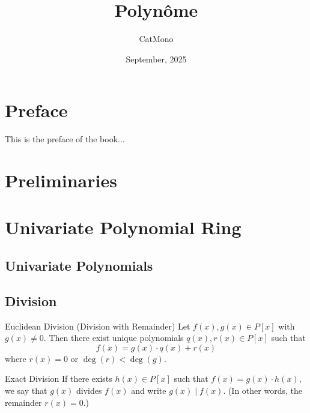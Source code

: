 \documentclass[11pt]{elegantbook}
\title{Polynôme} %
\author{CatMono} %
\date{September, 2025} %
\begin{document}
\maketitle %

\frontmatter        %
\tableofcontents    %

\chapter{Preface}   %
This is the preface of the book...

\mainmatter         %

\chapter{Preliminaries} %

\chapter{Univariate Polynomial Ring}
\section{Univariate Polynomials}

\section{Division}

\begin{theorem}{Euclidean Division (Division with Remainder)}
    Let \( f(x), g(x) \in P[x] \) with \( g(x) \neq 0 \). 
    Then there exist unique polynomials \( q(x), r(x) \in P[x] \) such that
    \[
    f(x) = g(x) \cdot q(x) + r(x)
    \]
    where \( r(x) = 0 \) or \( \deg(r) < \deg(g) \).
\end{theorem}

\begin{definition}{Exact Division}
    If there exists \( h(x)\in P[x] \) such that \( f(x) = g(x) \cdot h(x) \), 
    we say that \( g(x) \) divides \( f(x) \) and write \( g(x) \mid f(x) \).
    (In other words, the remainder \( r(x) = 0 \).)
\end{definition}
\end{document}
